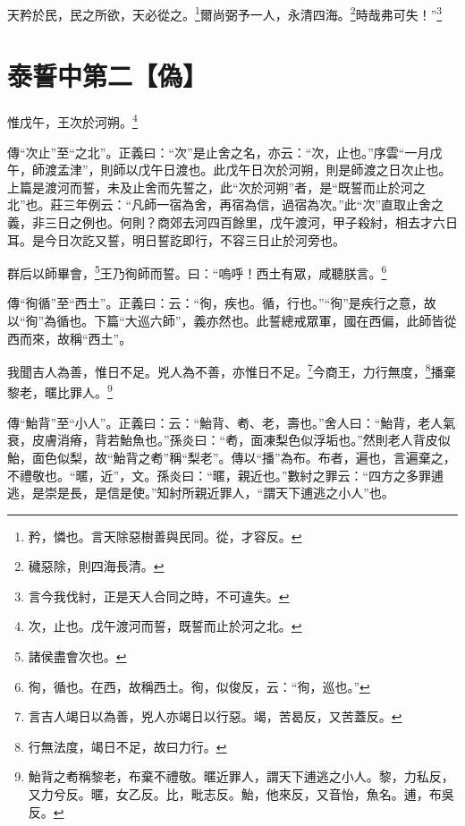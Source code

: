 天矜於民，民之所欲，天必從之。\footnote{矜，憐也。言天除惡樹善與民同。從，才容反。}爾尚弼予一人，永清四海。\footnote{穢惡除，則四海長清。}時哉弗可失！”\footnote{言今我伐紂，正是天人合同之時，不可違失。}

\section{泰誓中第二【偽】}


惟戊午，王次於河朔。\footnote{次，止也。戊午渡河而誓，既誓而止於河之北。}

{\noindent\zhuan{}\fzbyks 傳“次止”至“之北”。正義曰：“次”是止舍之名，亦云：“次，止也。”序雲“一月戊午，師渡孟津”，則師以戊午日渡也。此戊午日次於河朔，則是師渡之日次止也。上篇是渡河而誓，未及止舍而先誓之，此“次於河朔”者，是“既誓而止於河之北”也。莊三年例云：“凡師一宿為舍，再宿為信，過宿為次。”此“次”直取止舍之義，非三日之例也。何則？商郊去河四百餘里，戊午渡河，甲子殺紂，相去才六日耳。是今日次訖又誓，明日誓訖即行，不容三日止於河旁也。 \par}

群后以師畢會，\footnote{諸侯盡會次也。}王乃徇師而誓。曰：“嗚呼！西土有眾，咸聽朕言。\footnote{徇，循也。在西，故稱西土。徇，似俊反，云：“徇，巡也。”}

{\noindent\zhuan{}\fzbyks 傳“徇循”至“西土”。正義曰：云：“徇，疾也。循，行也。”“徇”是疾行之意，故以“徇”為循也。下篇“大巡六師”，義亦然也。此誓總戒眾軍，國在西偏，此師皆從西而來，故稱“西土”。 \par}

我聞吉人為善，惟日不足。兇人為不善，亦惟日不足。\footnote{言吉人竭日以為善，兇人亦竭日以行惡。竭，苦曷反，又苦蓋反。}今商王，力行無度，\footnote{行無法度，竭日不足，故曰力行。}播棄黎老，暱比罪人。\footnote{鮐背之耇稱黎老，布棄不禮敬。暱近罪人，謂天下逋逃之小人。黎，力私反，又力兮反。暱，女乙反。比，毗志反。鮐，他來反，又音怡，魚名。逋，布吳反。}

{\noindent\zhuan{}\fzbyks 傳“鮐背”至“小人”。正義曰：云：“鮐背、耇、老，壽也。”舍人曰：“鮐背，老人氣衰，皮膚消瘠，背若鮐魚也。”孫炎曰：“耇，面凍梨色似浮垢也。”然則老人背皮似鮐，面色似梨，故“鮐背之耇”稱“梨老”。傳以“播”為布。布者，遍也，言遍棄之，不禮敬也。“暱，近”，文。孫炎曰：“暱，親近也。”數紂之罪云：“四方之多罪逋逃，是崇是長，是信是使。”知紂所親近罪人，“謂天下逋逃之小人”也。 \par}

